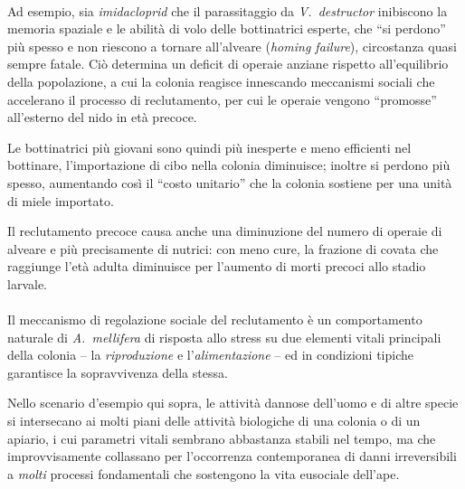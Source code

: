 \paragraph{}
Ad esempio, sia \emph{imidacloprid} che il parassitaggio da \emph{V.~destructor} inibiscono la memoria spaziale e le abilità di volo delle bottinatrici esperte, che ``si perdono'' più spesso e non riescono a tornare all'alveare (\emph{homing failure}), circostanza quasi sempre fatale. Ciò determina un deficit di operaie anziane rispetto all'equilibrio della popolazione, a cui la colonia reagisce innescando meccanismi sociali che accelerano il processo di reclutamento, per cui le operaie vengono ``promosse'' all'esterno del nido in età precoce.

Le bottinatrici più giovani sono quindi più inesperte e meno efficienti nel bottinare, l'importazione di cibo nella colonia diminuisce; inoltre si perdono più spesso, aumentando così il ``costo unitario'' che la colonia sostiene per una unità di miele importato.

Il reclutamento precoce causa anche una diminuzione del numero di operaie di alveare e più precisamente di nutrici:
con meno cure, la frazione di covata che raggiunge l'età adulta diminuisce per l'aumento di morti precoci allo stadio larvale.

\paragraph{}
Il meccanismo di regolazione sociale del reclutamento è un comportamento naturale di \emph{A.~mellifera}
di risposta allo stress su due elementi vitali principali della colonia -- la \emph{riproduzione} e l'\emph{alimentazione} -- ed in condizioni tipiche garantisce la sopravvivenza della stessa.

Nello scenario d'esempio qui sopra, le attività dannose dell'uomo e di altre specie si intersecano ai molti piani delle attività biologiche di una colonia o di un apiario, i cui parametri vitali sembrano abbastanza stabili nel tempo, ma che improvvisamente collassano per l'occorrenza contemporanea di danni irreversibili a \emph{molti} processi fondamentali che sostengono la vita eusociale dell'ape.

